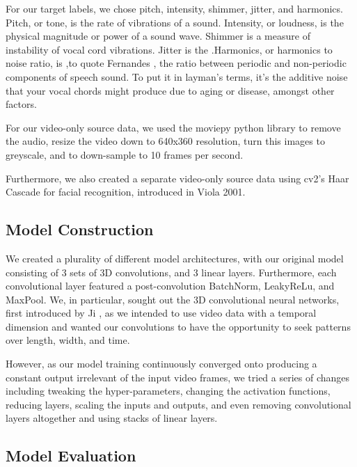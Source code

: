 \documentclass[10pt,twocolumn,letterpaper]{article}
\begin{document}
For our target labels, we chose pitch, intensity, shimmer, jitter, and harmonics. Pitch, or tone, is the rate of vibrations of a sound. Intensity, or loudness, is the physical magnitude or power of a sound wave. Shimmer is a measure of instability of vocal cord vibrations. Jitter is the .Harmonics, or harmonics to noise ratio, is ,to quote Fernandes \cite{Harmon2018}, the ratio between periodic and non-periodic components of speech sound. To put it in layman's terms, it's the additive noise that your vocal chords might produce due to aging or disease, amongst other factors.

For our video-only source data, we used the moviepy python library to remove the audio, resize the video down to 640x360 resolution, turn this images to greyscale, and to down-sample to 10 frames per second. 

Furthermore, we also created a separate video-only source data using cv2's Haar Cascade for facial recognition, introduced in Viola 2001\cite{HaarCascade2001}.

\subsection{Model Construction}

We created a plurality of different model architectures, with our original model consisting of 3 sets of 3D convolutions, and 3 linear layers. Furthermore, each convolutional layer featured a post-convolution BatchNorm, LeakyReLu, and MaxPool. We, in particular, sought out the 3D convolutional neural networks, first introduced by Ji  \cite{Ji3DConv}, as we intended to use video data with a temporal dimension and wanted our convolutions to have the opportunity to seek patterns over length, width, and time.  

However, as our model training continuously converged onto producing a constant output irrelevant of the input video frames, we tried a series of changes including tweaking the hyper-parameters, changing the activation functions,  reducing layers, scaling the inputs and outputs, and even removing convolutional layers altogether and using stacks of linear layers. 

\subsection{Model Evaluation}
\end{document}
